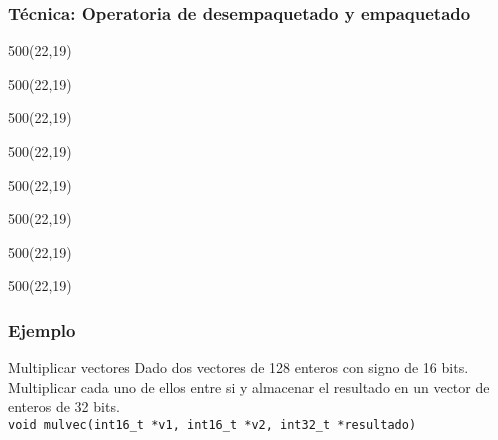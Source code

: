 \documentclass[aspectratio=169]{beamer}
\begin{document}
\begin{frame}[fragile]
    \frametitle{Técnica: Operatoria de desempaquetado y empaquetado}
    \large
    \begin{textblock}{500}(22,19)  \end{textblock}
    \begin{textblock}{500}(22,19)  \end{textblock}
    \begin{textblock}{500}(22,19)  \end{textblock}
    \begin{textblock}{500}(22,19)  \end{textblock}
    \begin{textblock}{500}(22,19)  \end{textblock}
    \begin{textblock}{500}(22,19)  \end{textblock}
    \begin{textblock}{500}(22,19)  \end{textblock}
    \begin{textblock}{500}(22,19)  \end{textblock}
\end{frame}

\begin{frame}[fragile]
    \frametitle{Ejemplo}
    \begin{block}{Multiplicar vectores}
    Dado dos vectores de 128 enteros con signo de 16 bits. Multiplicar cada uno de ellos entre si y almacenar el resultado en un vector de enteros de 32 bits.\\
    \bigskip
    \verb|void mulvec(int16_t *v1, int16_t *v2, int32_t *resultado)|
    \end{block}
\end{frame}
\end{document}
